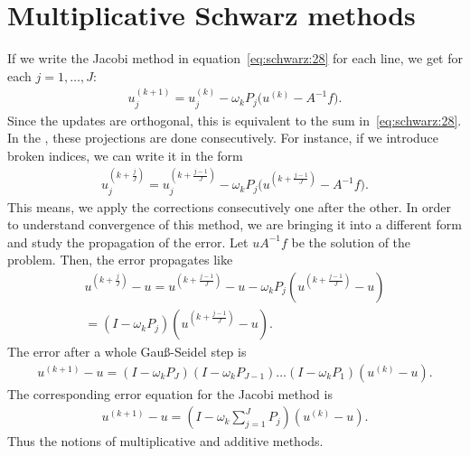 \section{Multiplicative Schwarz methods}

\begin{example}
  If we write the Jacobi method in equation~\eqref{eq:schwarz:28} for
  each line, we get for each $j=1,\ldots,J$:
  \begin{gather}
    \label{eq:schwarz:29}
      u_j^{(k+1)} = u_j^{(k)} - \omega_k P_j \bigl(u^{(k)} - A^{-1}f\bigr).
  \end{gather}
  Since the updates are orthogonal, this is equivalent to the sum
  in~\eqref{eq:schwarz:28}. In the , these
  projections are done consecutively. For instance, if we introduce
  broken indices, we can write it in the form
  \begin{gather}
    \label{eq:schwarz:30}
      u_j^{(k+\frac{j}{J})} = u_j^{(k+\frac{j-1}{J})}
      - \omega_k P_j \bigl(u^{(k+\frac{j-1}{J})} - A^{-1}f\bigr).
  \end{gather}
  This means, we apply the corrections consecutively one after the
  other. In order to understand convergence of this method, we are
  bringing it into a different form and study the propagation of the
  error. Let $uA^{-1}f$ be the solution of the problem. Then, the
  error propagates like
  \begin{multline}
    \label{eq:schwarz:31}
      u^{(k+\frac{j}{J})} - u = u^{(k+\frac{j-1}{J})} - u
      - \omega_k P_j \left(u^{(k+\frac{j-1}{J})} - u\right) \\
      = (I-\omega_k P_j) \left(u^{(k+\frac{j-1}{J})} - u\right).
  \end{multline}
  The error after a whole Gauß-Seidel step is
  \begin{gather}
    \label{eq:schwarz:32}
      u^{(k+1)} - u
      = (I-\omega_k P_J)(I-\omega_k P_{J-1})\dots(I-\omega_k P_1) \left(u^{(k)} - u\right).
  \end{gather}
  The corresponding error equation for the Jacobi method is
  \begin{gather}
    \label{eq:schwarz:33}
    u^{(k+1)} - u = \left(I-\omega_k \sum_{j=1}^J P_j\right) \left(u^{(k)} - u\right).
  \end{gather}
  Thus the notions of multiplicative and additive methods.
\end{example}


